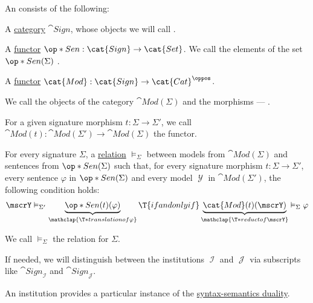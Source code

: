 \begin{definition}\label{def:institution}
  An  consists of the following:
  \begin{thmenum}
     A \hyperref[def:category]{category} \( \cat{Sign} \), whose objects we will call .

     A \hyperref[def:functor]{functor} \( \op*{Sen}: \cat{Sign} \to \cat{Set} \). We call the elements of the set \( \op*{Sen}(\Sigma) \) .

     A \hyperref[def:functor]{functor} \( \cat{Mod}: \cat{Sign} \to \cat{Cat}^\oppos \).
    \begin{thmenum}
       We call the objects of the category \( \cat{Mod}(\Sigma) \)  and the morphisms --- .

        For a given signature morphism \( t: \Sigma \to \Sigma' \), we call \( \cat{Mod}(t): \cat{Mod}(\Sigma') \to \cat{Mod}(\Sigma) \) the  functor.
    \end{thmenum}

     For every signature \( \Sigma \), a \hyperref[def:relation]{relation} \( {\vDash_\Sigma} \) between models from \( \cat{Mod}(\Sigma) \) and sentences from \( \op*{Sen}(\Sigma) \) such that, for every signature morphism \( t: \Sigma \to \Sigma' \), every sentence \( \varphi \) in \( \op*{Sen}(\Sigma) \) and every model \( \mscrY \) in \( \cat{Mod}(\Sigma') \), the following condition holds:
    \begin{equation}\label{eq:def:institution/satisfaction}
      \mscrY \vDash_{\Sigma'} \underbrace{\op*{Sen}(t)(\varphi)}_{\mathclap{\T*{translation of} \varphi}}
      \T{if and only if}
      \underbrace{\cat{Mod}(t)(\mscrY)}_{\mathclap{\T*{reduct of} \mscrY}} \vDash_\Sigma \varphi
    \end{equation}

    We call \( \vDash_\Sigma \) the  relation for \( \Sigma \).
  \end{thmenum}
\end{definition}
\begin{comments}
  \item If needed, we will distinguish between the institutions \( \mscrI \) and \( \mscrJ \) via subscripts like \( \cat{Sign}_\mscrI \) and \( \cat{Sign}_\mscrJ \).

  \item An institution provides a particular instance of the \hyperref[con:syntax_semantics_duality]{syntax-semantics duality}.
\end{comments}

